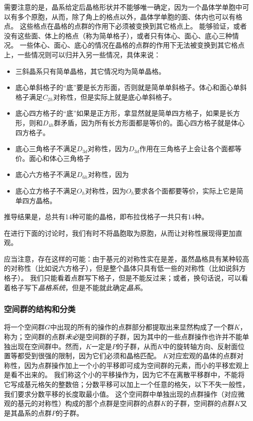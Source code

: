 需要注意的是，晶系给定后晶格形状并不能够唯一确定，因为一个晶体学单胞中可以有多个原胞，从而，除了角上的格点以外，晶体学单胞的面、体内也可以有格点。
这些格点在晶格的点群的作用下必须被变换到其它格点上。
能够验证，或者没有这些面、体上的格点（称为简单格子），或者只有体心、面心、底心三种情况。
一些体心、面心、底心的情况在晶格的点群的作用下无法被变换到其它格点上，一些情况则可以归并入另一些情况，具体来说：
\begin{itemize}
    \item 三斜晶系只有简单晶格，其它情况均为简单晶格。
    \item 底心单斜格子的“底”要是长方形面，否则就是简单单斜格子。体心和面心单斜格子满足$C_{2h}$对称性，但是实际上就是底心单斜格子。
    \item 底心四方格子的“底”如果是正方形，拿显然就是简单四方格子，如果是长方形，则和$D_{4h}$群矛盾，因为所有长方形面都是等价的。面心四方格子就是体心四方格子。
    \item 底心三角格子不满足$D_{3d}$对称性，因为$D_{3d}$作用在三角格子上会让各个面都等价。面心和体心三角格子%
    \item 底心六方格子不满足$D_{6h}$对称性，因为%
    \item 底心立方格子不满足$O_h$对称性，因为$O_h$要求各个面都要等价，实际上它是简单四方晶格。
\end{itemize}
推导结果是，总共有14种可能的晶格，即布拉伐格子一共只有14种。

在进行下面的讨论时，我们有时不将晶胞取为原胞，从而让对称性展现得更加直观。

应当注意，存在这样的可能：由于基元的对称性实在是差，虽然晶格具有某种较高的对称性（比如说六方格子），但是整个晶体只具有低一些的对称性（比如说斜方格子）。
我们只能看着点群写下格子，但是不能反过来；或者，换句话说，可以看着格子写下\emph{晶格系统}，但是不能就此确定\emph{晶系}。

\subsubsection{空间群的结构和分类}

将一个空间群$G$中出现的所有的操作的点群部分都提取出来显然构成了一个群$K$，称为；空间群的点群\emph{未必}是空间群的子群，因为其中的一些点群操作也许并不能单独出现在空间群中。然而，$K$一定是$P$的子群，从而$K$中的旋转轴方向、反射面位置等都受到很强的限制，因为它们必须和晶格匹配。
$K$对应宏观的晶体的点群对称性，因为点群操作加上一个小的平移即可成为空间群的元素，而小的平移宏观上是看不出来的。
我们称这个小的平移操作为，因为它不在离散平移群中，不能将它写成基元格矢的整数倍；分数平移可以加上一个任意的格矢，以下不失一般性，我们要求分数平移的长度取最小值。
这个空间群中单独出现的点群操作（对应微观的基元的对称性）构成的那个点群是空间群的点群$K$的子群，空间群的点群$K$又是其晶系的点群$P$的子群。

